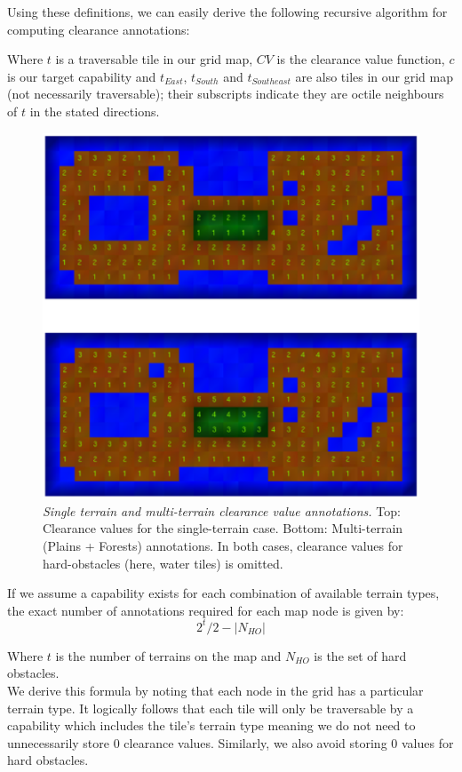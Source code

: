 Using these definitions, we can easily derive the following recursive algorithm for computing clearance annotations:



Where $t$ is a traversable tile in our grid map, $CV$ is the clearance value function, $c$ is our target capability and $t_{East}$, $t_{South}$ and $t_{Southeast}$ are also tiles in our grid map (not necessarily traversable); their  subscripts indicate they are octile neighbours of $t$ in the stated directions.

\begin{figure}[htbp]
        \caption{\emph{Single terrain and multi-terrain clearance value annotations.} Top: Clearance values for the single-terrain case. Bottom: Multi-terrain (Plains + Forests) annotations. In both cases, clearance values for hard-obstacles (here, water tiles) is omitted.}
        \begin{center}
                        \includegraphics[scale=0.4]{diagrams/annotations.eps}
        \end{center}
        \label{aha-fig:annotations}
\end{figure}

If we assume a capability exists for each combination of available terrain types, the exact number of annotations required for each map node is given by:
\begin{equation}
2^t/2 - |N_{HO}|
\label{aha-eq:cv}
\end{equation}

Where $t$ is the number of terrains on the map and $N_{HO}$ is the set of hard obstacles. \\ \newline
We derive this formula by noting that each node in the grid has a particular terrain type. It logically follows that each tile will only be traversable by a capability which includes the tile's terrain type meaning we do not need to unnecessarily store 0 clearance values. Similarly, we also avoid storing 0 values for hard obstacles.

